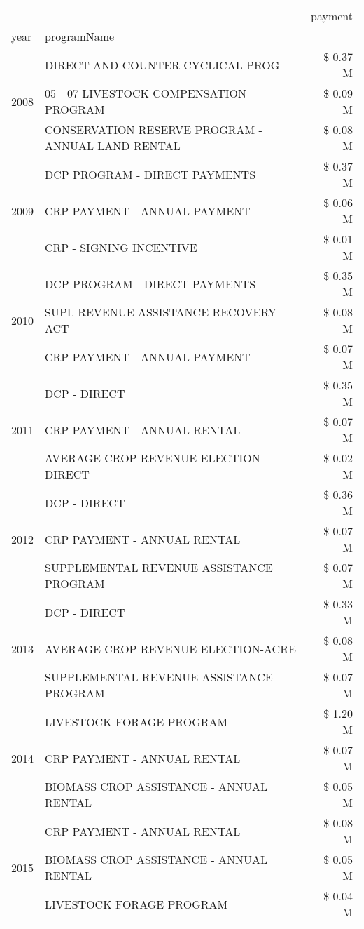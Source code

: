 \begin{tabular}{llr}
\toprule
 &  & payment \\
year & programName &  \\
\midrule
\multirow[t]{3}{*}{2008} & DIRECT AND COUNTER CYCLICAL PROG & \$ 0.37 M \\
 & 05 - 07 LIVESTOCK COMPENSATION PROGRAM & \$ 0.09 M \\
 & CONSERVATION RESERVE PROGRAM - ANNUAL LAND RENTAL & \$ 0.08 M \\
\cline{1-3}
\multirow[t]{3}{*}{2009} & DCP PROGRAM - DIRECT PAYMENTS & \$ 0.37 M \\
 & CRP PAYMENT - ANNUAL PAYMENT & \$ 0.06 M \\
 & CRP - SIGNING INCENTIVE & \$ 0.01 M \\
\cline{1-3}
\multirow[t]{3}{*}{2010} & DCP PROGRAM - DIRECT PAYMENTS & \$ 0.35 M \\
 & SUPL REVENUE ASSISTANCE RECOVERY ACT & \$ 0.08 M \\
 & CRP PAYMENT - ANNUAL PAYMENT & \$ 0.07 M \\
\cline{1-3}
\multirow[t]{3}{*}{2011} & DCP - DIRECT & \$ 0.35 M \\
 & CRP PAYMENT - ANNUAL RENTAL & \$ 0.07 M \\
 & AVERAGE CROP REVENUE ELECTION-DIRECT & \$ 0.02 M \\
\cline{1-3}
\multirow[t]{3}{*}{2012} & DCP - DIRECT & \$ 0.36 M \\
 & CRP PAYMENT - ANNUAL RENTAL & \$ 0.07 M \\
 & SUPPLEMENTAL REVENUE ASSISTANCE PROGRAM & \$ 0.07 M \\
\cline{1-3}
\multirow[t]{3}{*}{2013} & DCP - DIRECT & \$ 0.33 M \\
 & AVERAGE CROP REVENUE ELECTION-ACRE & \$ 0.08 M \\
 & SUPPLEMENTAL REVENUE ASSISTANCE PROGRAM & \$ 0.07 M \\
\cline{1-3}
\multirow[t]{3}{*}{2014} & LIVESTOCK FORAGE PROGRAM & \$ 1.20 M \\
 & CRP PAYMENT - ANNUAL RENTAL & \$ 0.07 M \\
 & BIOMASS CROP ASSISTANCE - ANNUAL RENTAL & \$ 0.05 M \\
\cline{1-3}
\multirow[t]{3}{*}{2015} & CRP PAYMENT - ANNUAL RENTAL & \$ 0.08 M \\
 & BIOMASS CROP ASSISTANCE - ANNUAL RENTAL & \$ 0.05 M \\
 & LIVESTOCK FORAGE PROGRAM & \$ 0.04 M \\

\end{tabular}
